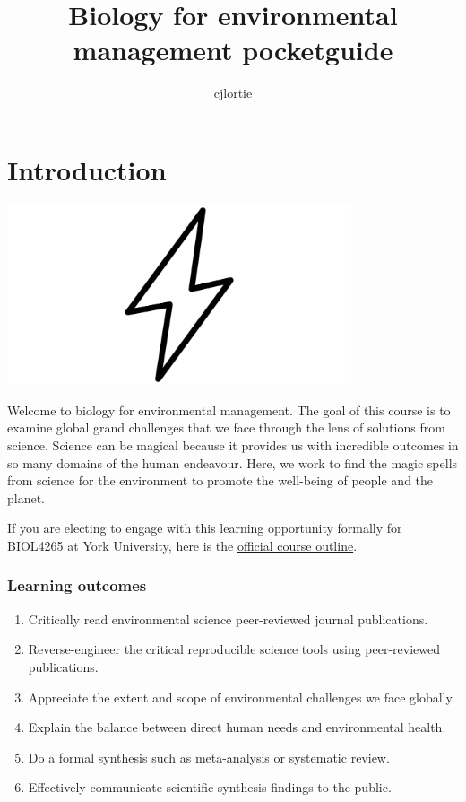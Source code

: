 \documentclass[
]{book}
\title{Biology for environmental management pocketguide}
\author{cjlortie}
\date{}
\providecommand{\tightlist}{%
  \setlength{\itemsep}{0pt}\setlength{\parskip}{0pt}}
\begin{document}
\maketitle

{
\setcounter{tocdepth}{1}
\tableofcontents
}
\hypertarget{introduction}{%
\chapter{Introduction}\label{introduction}}

\includegraphics[width=4in,height=\textheight]{./bolt.png}

Welcome to biology for environmental management. The goal of this course is to examine global grand challenges that we face through the lens of solutions from science. Science can be magical because it provides us with incredible outcomes in so many domains of the human endeavour. Here, we work to find the magic spells from science for the environment to promote the well-being of people and the planet.

If you are electing to engage with this learning opportunity formally for BIOL4265 at York University, here is the \href{https://figshare.com/articles/online_resource/BIOL3250-2021_course_outline/14944590}{official course outline}.

\hypertarget{learning-outcomes}{%
\subsection*{Learning outcomes}\label{learning-outcomes}}

\begin{enumerate}
\def\labelenumi{\arabic{enumi}.}
\tightlist
\item
  Critically read environmental science peer-reviewed journal publications.\\
\item
  Reverse-engineer the critical reproducible science tools using peer-reviewed publications.\\
\item
  Appreciate the extent and scope of environmental challenges we face globally.\\
\item
  Explain the balance between direct human needs and environmental health.\\
\item
  Do a formal synthesis such as meta-analysis or systematic review.\\
\item
  Effectively communicate scientific synthesis findings to the public.
\end{enumerate}
\end{document}

